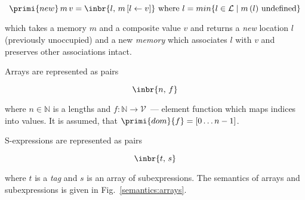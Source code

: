 \[
\primi{new}\,m\,v=\inbr{l,\,m\,[l\gets v]}\mbox{ where }l=min\{l\in\mathcal{L}\mid m\,(l)\mbox{ undefined}\}
\]

which takes a memory $m$ and a composite value $v$ and returns a \emph{new} location $l$ (previously unoccupied) and a new \emph{memory} which
associates $l$ with $v$ and preserves other associations intact.

Arrays are represented as pairs

\[
\inbr{n,\,f}
\]

where $n\in\mathbb N$ is a lengths and $f : \mathbb{N}\to\mathcal{V}$~--- element function which maps indices into values. It is assumed, that
$\primi{dom}{f}=[0\dots n-1]$.

S-expressions are represented as pairs

\[
\inbr{t,\,s}
\]

where $t$ is a \emph{tag} and $s$ is an array of subexpressions. The semantics of arrays and subexpressions is given in Fig.~\ref{semantics:arrays}.

